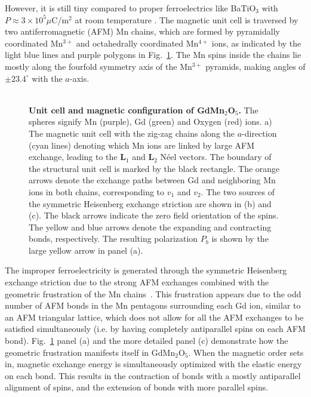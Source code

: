 However, it is still tiny compared to proper ferroelectrics like BaTiO$_3$ with $P \approx 3 \times 10^5 \mu $C/m$^2$ at room temperature \cite{Mason1948,VonHippel1950}.
The magnetic unit cell is traversed by two antiferromagnetic (AFM) Mn chains, which are formed by pyramidally coordinated Mn$^{3+}$ and octahedrally coordinated Mn$^{4+}$ ions, as indicated by the light blue lines and purple polygons in Fig.~\ref{fig:GdMn2O5_unit_cell}.
The Mn spins inside the chains lie mostly along the fourfold symmetry axis of the Mn$^{3+}$ pyramids, making angles of $\pm 23.4^\circ$ with the $a$-axis.
\\\\
\begin{figure}
	\caption{\label{fig:GdMn2O5_unit_cell}{\bf Unit cell and magnetic configuration of GdMn$_2$O$_5$.} The spheres signify Mn (purple), Gd (green) and Oxygen (red) ions. a) The magnetic unit cell with the zig-zag chains along the $a$-direction (cyan lines) denoting which Mn ions are linked by large AFM exchange, leading to the $\bm{L}_1$ and $\bm{L}_2$ N\'eel vectors. The boundary of the structural unit cell is marked by the black rectangle. The orange arrows denote the exchange paths between Gd and neighboring Mn ions in both chains, corresponding to $v_1$ and $v_2$. The two sources of the symmetric Heisenberg exchange striction are shown in (b) and (c). The black arrows indicate the zero field orientation of the spins. The yellow and blue arrows denote the expanding and contracting bonds, respectively. The resulting polarization $P_b$ is shown by the large yellow arrow in panel (a).}
\end{figure}
The improper ferroelectricity is generated through the symmetric Heisenberg exchange striction due to the strong AFM exchanges combined with the geometric frustration of the Mn chains~\cite{Choi2008}.
This frustration appears due to the odd number of AFM bonds in the Mn pentagons surrounding each Gd ion, similar to an AFM triangular lattice, which does not allow for all the AFM exchanges to be satisfied simultaneously (i.e. by having completely antiparallel spins on each AFM bond).
Fig.~\ref{fig:GdMn2O5_unit_cell} panel (a) and the more detailed panel (c) demonstrate how the geometric frustration manifests itself in GdMn$_2$O$_5$.
When the magnetic order sets in, magnetic exchange energy is simultaneously optimized with the elastic energy on each bond.
This results in the contraction of bonds with a mostly antiparallel alignment of spins, and the extension of bonds with more parallel spins.
